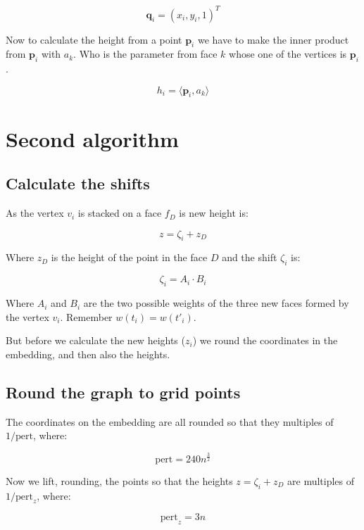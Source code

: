 \documentclass[10pt,a4paper]{article}
\begin{document}
$$\mathbf{q}_i = (x_i,y_i,1)^T$$

Now to calculate the height from a point $\mathbf{p}_i$ we have to make the inner product from $\mathbf{p}_i$ with $a_k$. Who is the parameter from face $k$ whose one of the vertices is $\mathbf{p}_i$.

$$h_i = \langle \mathbf{p}_i, a_k\rangle$$

\section{Second algorithm}

\subsection{Calculate the shifts} 

As the vertex $v_i$ is stacked on a face $f_D$ is new height is:

$$z= \zeta_i + z_D $$

Where $z_D$ is the height of the point in the face $D$ and the shift $\zeta_i$ is:

$$\zeta_i = A_i\cdot B_i$$

Where  $ A_i$ and $B_i$ are the two possible weights of the three new faces formed by the vertex $v_i$. Remember $w(t_i)= w(t'_i) $.

But before we calculate the new heights ($z_i$) we round the coordinates in the embedding, and then also the heights.

\subsection{Round the graph to grid points}

The coordinates on the embedding are all rounded so that they multiples of $1/\text{pert}$, where:

$$\text{pert}=240n^{\frac{3}{2}}$$

Now we lift, rounding, the points so that the heights $z= \zeta_i + z_D $ are multiples of $1/\text{pert}_z$, where: 

$$\text{pert}_z=3n$$ 
\end{document}
